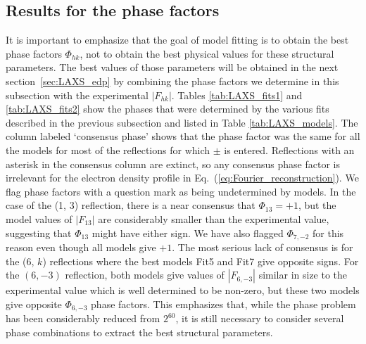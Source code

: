 \subsection{Results for the phase factors}\label{sec:LAXS_phases_results}
It is important to emphasize that the goal of model fitting is to obtain the 
best phase factors $\Phi_{hk}$, not to obtain the best physical values for these 
structural parameters.  The best values of those parameters will be obtained 
in the next section~\ref{sec:LAXS_edp} by combining the phase factors we 
determine in this subsection with the experimental $|F_{hk}|$.  
Tables \ref{tab:LAXS_fits1} and \ref{tab:LAXS_fits2} show the phases that 
were determined by the various fits described in the previous subsection and 
listed in Table \ref{tab:LAXS_models}. The column labeled `consensus phase'
shows that the phase factor was the same for all the models for most of the 
reflections for which $\pm$ is entered.  Reflections with an asterisk in the 
consensus column are extinct, so any consensus phase factor is irrelevant for 
the electron density profile in Eq.~(\ref{eq:Fourier_reconstruction}). 
We flag phase factors with a question 
mark as being undetermined by models.  In the case of the (1, 3) reflection, 
there is a near consensus that $\Phi_{13}=+1$, but the model values of 
$|F_{13}|$ are considerably smaller than the experimental value, suggesting 
that $\Phi_{13}$ might have either sign.  We have also flagged $\Phi_{7,-2}$ 
for this reason even though all models give $+1$. The most serious lack of 
consensus is for the (6, $k$) reflections where the best models Fit5 and Fit7 
give opposite signs. For the $(6,-3)$ reflection, both models give values of 
$|F_{6,-3}|$ similar in size to the experimental value which is well 
determined to be non-zero, but these two models give opposite $\Phi_{6,-3}$ 
phase factors.  This emphasizes that, while the phase problem has been 
considerably reduced from $2^{60}$, it is still necessary to consider several 
phase combinations to extract the best structural parameters.
